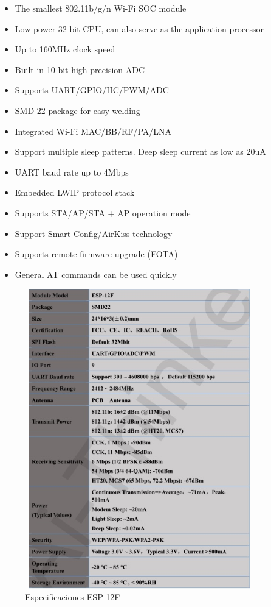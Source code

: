     \begin{itemize}
        \item The smallest 802.11b/g/n Wi-Fi SOC module
        \item Low power 32-bit CPU, can also serve as the application processor
        \item Up to 160MHz clock speed
        \item Built-in 10 bit high precision ADC
        \item Supports UART/GPIO/IIC/PWM/ADC
        \item SMD-22 package for easy welding
        \item Integrated Wi-Fi MAC/BB/RF/PA/LNA
        \item Support multiple sleep patterns. Deep sleep current as low as 20uA
        \item UART baud rate up to 4Mbps
        \item Embedded LWIP protocol stack
        \item Supports STA/AP/STA + AP operation mode
        \item Support Smart Config/AirKiss technology
        \item Supports remote firmware upgrade (FOTA)
        \item General AT commands can be used quickly
    \end{itemize}

    \begin{figure}[H]
        \centering
        \includegraphics[width=10cm, height=13cm]{imagenes/esp-12F especificaciones.jpg}
        \caption{Especificaciones ESP-12F}
        \label{imag:esp-12F_especificaciones}
    \end{figure}

